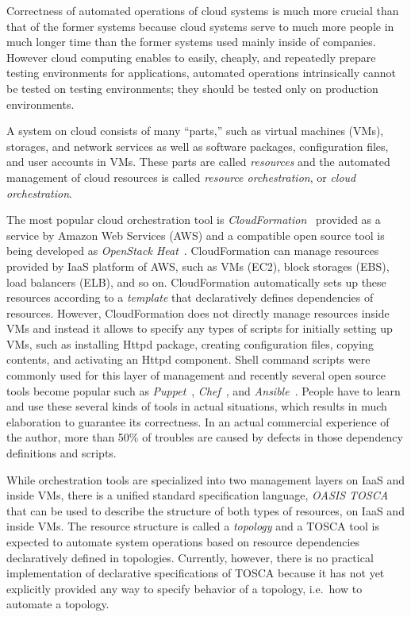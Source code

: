 \documentclass[12pt]{report}
\begin{document}
Correctness of automated operations of cloud systems is much more
crucial than that of the former systems because cloud systems serve to
much more people in much longer time than the former systems used
mainly inside of companies. However cloud computing enables to easily,
cheaply, and repeatedly prepare testing environments for applications,
automated operations intrinsically cannot be tested on testing
environments; they should be tested only on production environments.

A system on cloud consists of many ``parts,'' such as virtual machines
(VMs), storages, and network services as well as software packages,
configuration files, and user accounts in VMs. These parts are called
{\it resources} and the automated management of cloud resources is
called {\it resource orchestration}, or {\it cloud orchestration}.

The most popular cloud orchestration tool is {\it
  CloudFormation}~\cite{CloudFormation} provided as a service by
Amazon Web Services (AWS) and a compatible open source tool is being
developed as {\it OpenStack Heat}~\cite{Heat}. CloudFormation can
manage resources provided by IaaS platform of AWS, such as VMs (EC2),
block storages (EBS), load balancers (ELB), and so on. CloudFormation
automatically sets up these resources according to a {\it template}
that declaratively defines dependencies of resources. However,
CloudFormation does not directly manage resources inside VMs and
instead it allows to specify any types of scripts for initially
setting up VMs, such as installing Httpd package, creating
configuration files, copying contents, and activating an Httpd
component. Shell command scripts were commonly used for this layer of
management and recently several open source tools become popular such
as {\it Puppet}~\cite{Puppet}, {\it Chef}~\cite{Chef}, and {\it
  Ansible}~\cite{Ansible}. People have to learn and use these
several kinds of tools in actual situations, which results in much
elaboration to guarantee its correctness. In an actual commercial
experience of the author, more than 50\% of troubles are caused by
defects in those dependency definitions and scripts.

While orchestration tools are specialized into two management layers
on IaaS and inside VMs, there is a unified standard specification
language, {\it OASIS TOSCA}~\cite{TOSCA} that can be used to describe
the structure of both types of resources, on IaaS and inside VMs. The
resource structure is called a {\it topology} and a TOSCA tool is
expected to automate system operations based on resource dependencies
declaratively defined in topologies.  Currently, however, there is no
practical implementation of declarative specifications of TOSCA
because it has not yet explicitly provided any way to specify behavior
of a topology, i.e.\ how to automate a topology.
\end{document}
